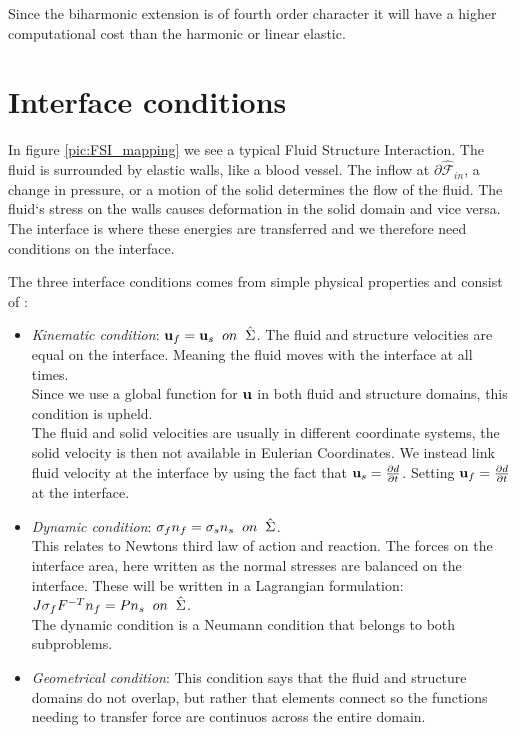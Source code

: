 Since the biharmonic extension is of fourth order character it will have a higher computational cost \cite{Richter2016} than the harmonic or linear elastic. 


\section{Interface conditions}
In figure \ref{pic:FSI_mapping} we see a typical Fluid Structure Interaction. The fluid is surrounded by elastic walls, like a blood vessel. The inflow at $\partial \hat{\mathcal{F}}_{in}$, a change in pressure, or a motion of the solid determines the flow of the fluid.
The fluid`s stress on the walls causes deformation in the solid domain and vice versa. The interface is where these energies are transferred and we therefore need conditions on the interface. \newline


The three interface conditions comes from simple physical properties and consist of \cite{Richter2016}:

\begin{itemize}
\item \textit{Kinematic condition}: $\bold{u}_f = \bold{u}_s  \hspace{2mm} on \hspace{2mm} \hat{\Sigma}$. The fluid and structure velocities are equal on the interface. Meaning the fluid moves with the interface at all times. \\
Since we use a global function for $\bold{u}$ in both fluid and structure domains, this condition is upheld.\\ 
The fluid and solid velocities are usually in different coordinate systems, the solid velocity is then not available in Eulerian Coordinates. We instead link fluid velocity at the interface by using the fact that $\bold{u}_s = \frac{\partial d}{\partial t}$. Setting $\bold{u}_f = \frac{\partial d}{\partial t}$ at the interface.

\item \textit{Dynamic condition}: $  \sigma_f n_f = \sigma_s n_s \hspace{2mm} on  \hspace{2mm}\hat{\Sigma}   $. \\
	This relates to Newtons third law of action and reaction. The forces on the interface area, here written as the normal stresses are balanced on the interface. These will be written in a Lagrangian formulation: \\
	$J\sigma_f F^{-T} n_f = P n_s \hspace{2mm} on  \hspace{2mm}\hat{\Sigma} $. \\
	The dynamic condition is a Neumann condition that belongs to both subproblems.
	
\item \textit{Geometrical condition}: This condition says that the fluid and structure domains do not overlap, but rather that elements connect so the functions needing to transfer force are continuos across the entire domain.
\end{itemize}



